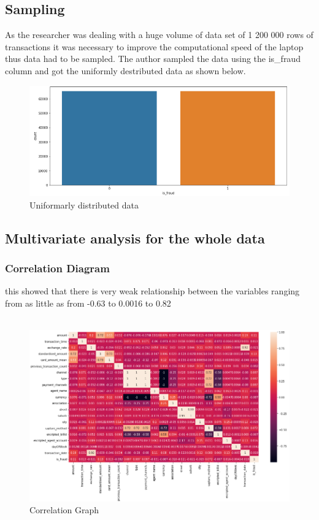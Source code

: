 \subsection{Sampling}
As the researcher was dealing with a huge volume of data set of 1 200 000 rows of transactions it was necessary to 
improve the computational speed of the laptop thus data had to be sampled. The author sampled the data using the 
is\_fraud column and got the uniformly destributed data as shown below.\\
\begin{figure}[h]
    \centering
    \includegraphics[width=1\linewidth]{image8}
    \caption{Uniformarly distributed data}
    \label{fig:example}
\end{figure}

\subsection{Multivariate analysis for the whole data}
\subsubsection{Correlation Diagram}
this showed that there is very weak relationship between the variables ranging from as little as from 
-0.63 to 0.0016 to 0.82\\ \\
\begin{figure}[h]
    \centering
    \includegraphics[width=1\linewidth]{image3}
    \caption{Correlation Graph}
    \label{fig:example}
\end{figure}
